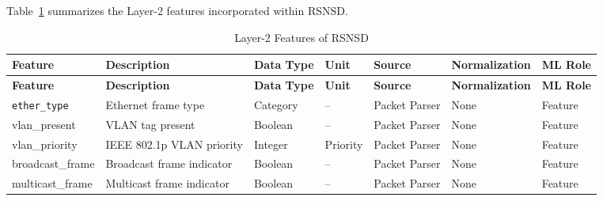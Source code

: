 \documentclass[12pt,a4paper]{article}
\begin{document}
Table~\ref{tab:l2_features} summarizes the Layer-2 features incorporated within RSNSD.
\begin{longtable}{p{3cm}p{5cm}p{2cm}p{1.5cm}p{2.3cm}p{2cm}p{2cm}}
	\caption{Layer-2 Features of RSNSD}
	\label{tab:l2_features}\\
	
	\toprule
	\textbf{Feature} & \textbf{Description} & \textbf{Data Type} & \textbf{Unit} & \textbf{Source} & \textbf{Normalization} & \textbf{ML Role} \\
	\midrule
	\endfirsthead
	
	\toprule
	\textbf{Feature} & \textbf{Description} & \textbf{Data Type} & \textbf{Unit} & \textbf{Source} & \textbf{Normalization} & \textbf{ML Role} \\
	\midrule
	\endhead
	
	\texttt{ether\_type} & Ethernet frame type & Category & -- & Packet Parser & None & Feature\\
	vlan\_present & VLAN tag present & Boolean & -- & Packet Parser & None & Feature\\
	vlan\_priority & IEEE 802.1p VLAN priority & Integer & Priority & Packet Parser & None & Feature\\
	broadcast\_frame & Broadcast frame indicator & Boolean & -- & Packet Parser & None & Feature\\
	multicast\_frame & Multicast frame indicator & Boolean & -- & Packet Parser & None & Feature\\
	
	\bottomrule
\end{longtable}
\end{document}
